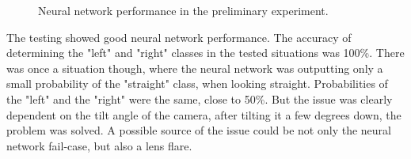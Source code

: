 \begin{figure}[!h]
  \begin{minipage}{.5\linewidth}
  \centering
  \end{minipage}
  \begin{minipage}{.5\linewidth}
  \centering	
  

  \end{minipage}
  
  
  \caption{Neural network performance in the preliminary experiment.}
  \label{fig:test_nn}
\end{figure}

The testing showed good neural network performance. The accuracy of determining the "left" and "right" classes in the tested situations was 100\%. There was once a situation though, where the neural network was outputting only a small probability of the "straight" class, when looking straight. Probabilities of the "left" and the "right" were the same, close to 50\%. But the issue was clearly dependent on the tilt angle of the camera, after tilting it a few degrees down, the problem was solved. A possible source of the issue could be not only the neural network fail-case, but also a lens flare.

